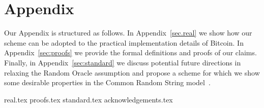 \section*{Appendix}

Our Appendix is structured as follows. In Appendix~\ref{sec.real} we show how
our scheme can be adopted to the practical implementation details of Bitcoin.
In Appendix~\ref{sec:proofs} we provide the formal definitions and proofs of our
claims. Finally, in Appendix~\ref{sec:standard}
we discuss potential future directions in relaxing the Random Oracle assumption
and propose a scheme for which we show some desirable properties in
the Common Random String model~\cite{STOC:BluFelMic88}.

{real.tex}
{proofs.tex}
{standard.tex}
{acknowledgements.tex}
